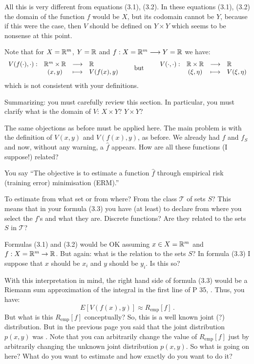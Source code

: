 \begin{description}[style=unboxed,leftmargin=0cm,itemsep=3ex]
All this is very different from  equations (3.1), (3.2).
In these equations (3.1), (3.2) the domain of the function $f$
would be $X$, but its codomain cannot be $Y$, because if this were the
case, then $V$ should be defined on $Y\times Y$ which seems to be nonsense
at this point.

Note that for $X={\mathbb R }^m$, $Y={\mathbb R }$ and $f:X={\mathbb R }^m\longrightarrow Y={\mathbb R }$
we have:
$$
\begin{array}{rccl}
V(f(\cdot),\cdot): & {\mathbb R }^m\times{\mathbb R }  & \longrightarrow & {\mathbb R } \\
   & (x,y) & \longmapsto     & V(f(x),y)
\end{array}
\qquad\text{but}\qquad
\begin{array}{rccl}
V(\cdot,\cdot): & {\mathbb R }\times{\mathbb R }  & \longrightarrow & {\mathbb R }     \\
    & (\xi,\eta) & \longmapsto     & V(\xi,\eta)
\end{array}
$$
which is not consistent with your definitions.

Summarizing: you must carefully review this section. In particular,
you must clarify what is the domain of $V$: $X\times Y$? $Y\times Y$?


The same objections as before must be applied here.
The main problem is with the definition of $V(x,y)$ and $V(f(x),y)$,
as before.
We already had $f$ and $f_S$ and now, without any warning, a $\widehat{f}$
appears.
How are all these functions (I suppose!) related?

You say ``The objective is to estimate a function $\widehat{f}$ through
empirical risk (training error) minimisation (ERM).''

To estimate from what set or from where?
From the class $\mathscr{T}$ of sets $S$?
This means that in your formula (3.3) you have (at least) to declare
from where you select the $f$'s and what they are. 
Discrete functions?
Are they related to the sets $S$ in $\mathscr{T}$?

Formulas (3.1) and (3.2) would be OK assuming $x\in X={\mathbb R }^m$ and
$f:X={\mathbb R }^m\to{\mathbb R }$.
But again: what is the relation to the sets $S$?
In formula (3.3) I suppose that $x$ should be $x_i$ and $y$ should be
$y_i$. Is this so?

With this interpretation in mind, the right hand side of formula (3.3)
would be a Riemann sum approximation of the integral in the first line
of P 35, .
Thus, you have:
$$
E[V(f(x),y)] \approx R_{\text{emp}}[f]\,.
$$
But what is this $R_{\text{emp}}[f]$ conceptually?
So, this is a well known joint (?) distribution.
But in the previous page you said that the joint distribution $p(x,y)$
was .
Note that you can arbitrarily change the value of $R_{\text{emp}}[f]$ just
by arbitrarily changing the unknown joint distribution $p(x,y)$.
So what is going on here?
What do you want to estimate and how exactly do you want to do it?



\end{description}
